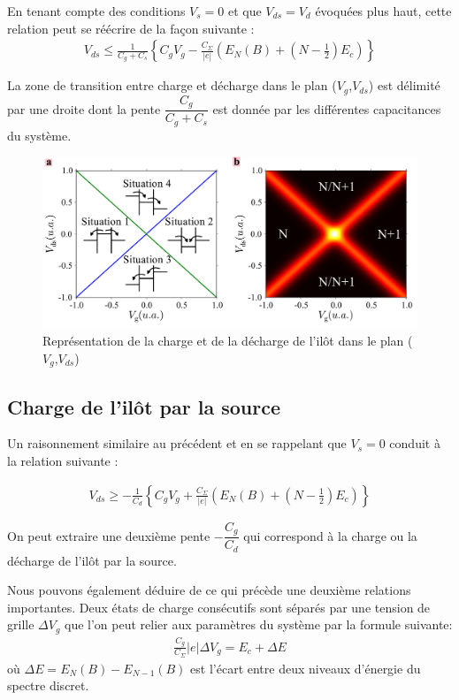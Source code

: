 En tenant compte des conditions $V_s= 0$ et que $V_{ds} = V_d$ évoquées plus haut, cette relation peut se réécrire de la façon suivante :
\begin{eqnarray}
V_{ds} \leq \frac{1}{C_g + C_s} \left\lbrace C_gV_g - \frac{C_{\Sigma}}{|e|}\left(E_N(B) + (N-\frac{1}{2})E_c \right) \right\rbrace 
\end{eqnarray}

La zone de transition entre charge et décharge dans le plan ($V_g$,$V_{ds}$) est délimité par une droite dont la pente $\dfrac{C_g}{C_g + C_s}$ est donnée par les différentes capacitances du système.


\begin{figure}
\includegraphics[scale=0.5]{Theorie/Transport/figure3/figure3.pdf} 
\caption{Représentation de la charge et de la décharge de l'il\^ot dans le plan ($V_g$,$V_{ds}$)}
\label{charge_discharge}
\end{figure}



\subsection{Charge de l'il\^ot par la source}
Un raisonnement similaire au précédent et en se rappelant que $V_s = 0$ conduit à la relation suivante :

\begin{eqnarray}
V_{ds} \geq -\frac{1}{C_d} \left\lbrace C_gV_g + \frac{C_{\Sigma}}{|e|}\left( E_N(B) + (N-\frac{1}{2})E_c \right) \right\rbrace
\end{eqnarray}


On peut extraire une deuxième pente $-\dfrac{C_g}{C_d}$ qui correspond à la charge ou la décharge de l'il\^ot par la source.

Nous pouvons également déduire de ce qui précède une deuxième relations importantes. Deux états de charge consécutifs sont séparés par une tension de grille $\Delta V_g$ que l'on peut relier aux paramètres du système par la formule suivante:
\begin{eqnarray}
\frac{C_g}{C_{\Sigma}} |e| \Delta V_g = E_c + \Delta E
\end{eqnarray}
où $\Delta E = E_N(B) - E_{N-1}(B)$ est l'écart entre deux niveaux d'énergie du spectre discret.
